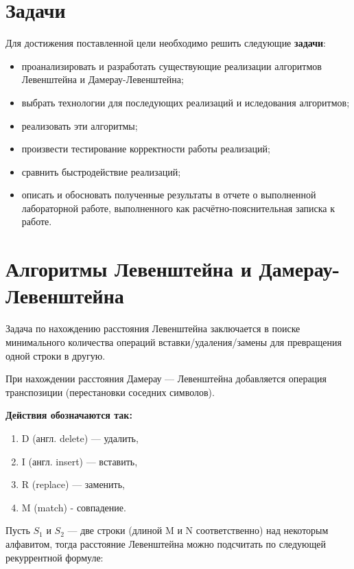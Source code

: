 \documentclass[12pt]{report}
\begin{document}
    \section{Задачи}
    Для достижения поставленной цели необходимо решить следующие {\bf задачи}:
    
    
    \begin{itemize}
    	\item проанализировать и разработать существующие реализации алгоритмов Левенштейна и Дамерау-Левенштейна;
    	\item выбрать технологии для последующих реализаций и иследования
    	алгоритмов;
    	\item реализовать эти алгоритмы;
    	\item произвести тестирование корректности работы реализаций;
    	\item сравнить быстродействие реализаций;
    	\item описать и обосновать полученные результаты в отчете о выполненной лабораторной работе, выполненного как расчётно-пояснительная
    	записка к работе.
    \end{itemize}
    
    
    \newpage
    \section{Алгоритмы Левенштейна и Дамерау-Левенштейна}
    
    Задача по нахождению расстояния Левенштейна заключается в поиске минимального количества операций вставки/удаления/замены для превращения одной строки в другую.
    
    При нахождении расстояния Дамерау — Левенштейна добавляется операция транспозиции (перестановки соседних символов).  
    
    \textbf{Действия обозначаются так:} 
    \begin{enumerate}
    	\item D (англ. delete) — удалить,
    	\item I (англ. insert) — вставить,
    	\item R (replace) — заменить,
    	\item M (match) - совпадение.
    \end{enumerate}
    
    Пусть $S_{1}$ и $S_{2}$ — две строки (длиной M и N соответственно) над некоторым алфавитом, тогда расстояние Левенштейна можно подсчитать по следующей рекуррентной формуле:
    
\end{document}
